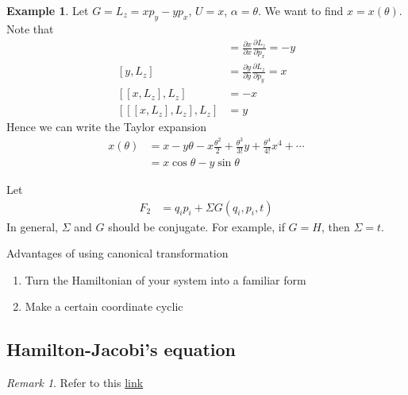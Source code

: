 \documentclass[twoside,9pt]{article}
\numberwithin{equation}{section} %
\newcommand{\lms}{\fontfamily{lmss}\selectfont} %
\theoremstyle{definition}
\newtheorem{example}{\lms Example}[section]
\theoremstyle{remark}
\newtheorem*{remark}{Remark}
\begin{document}
\begin{example}
Let $G=L_z=xp_y-yp_x$, $U=x$, $\alpha=\theta$.
We want to find $x=x(\theta)$.
Note that
\begin{align*}
    [x, L_z] &= \frac{\partial x}{\partial x}\frac{\partial L_z}{\partial p_x}
    = -y\\
    [y, L_z] &= \frac{\partial y}{\partial y}\frac{\partial L_z}{\partial p_y}
    = x\\
    [[x,L_z],L_z] &= -x\\
    [[[x, L_z], L_z], L_z] &= y
\end{align*}
Hence we can write the Taylor expansion
\begin{align*}
    x(\theta) &= x - y\theta - x \frac{\theta^2}{2}
    + \frac{\theta^3}{3!}y + \frac{\theta^4}{4!}x^4 + \cdots\\
              &= x\cos\theta - y\sin\theta
\end{align*}
\end{example}

Let 
\begin{align}
    F_2 &= q_ip_i + \Sigma G(q_i, p_i, t)
\end{align}
In general, $\Sigma$ and $G$ should be conjugate.
For example, if $G=H$, then $\Sigma=t$.

Advantages of using canonical transformation
\begin{enumerate}[label=\alph*)]
    \item Turn the Hamiltonian of your system into a familiar form
    \item Make a certain coordinate cyclic
\end{enumerate}

\subsection{Hamilton-Jacobi's equation}
\begin{remark}
Refer to this \href{https://phys.libretexts.org/Bookshelves/Classical_Mechanics/Variational_Principles_in_Classical_Mechanics_(Cline)/15%3A_Advanced_Hamiltonian_Mechanics/15.04%3A_Hamilton-Jacobi_Theory}{link}
\end{remark}
\end{document}
